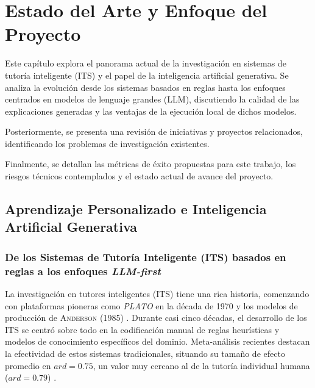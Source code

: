 \chapter{Estado del Arte y Enfoque del Proyecto}
\label{chap:estado_arte_enfoque}
\justifying

Este capítulo explora el panorama actual de la investigación en sistemas de tutoría inteligente (ITS) y el papel de la inteligencia artificial generativa. Se analiza la evolución desde los sistemas basados en reglas hasta los enfoques centrados en modelos de lenguaje grandes (LLM), discutiendo la calidad de las explicaciones generadas y las ventajas de la ejecución local de dichos modelos. 

Posteriormente, se presenta una revisión de iniciativas y proyectos relacionados, identificando los problemas de investigación existentes.

Finalmente, se detallan las métricas de éxito propuestas para este trabajo, los riesgos técnicos contemplados y el estado actual de avance del proyecto.

\section{Aprendizaje Personalizado e Inteligencia Artificial Generativa}
\label{sec:aprendizaje_personalizado_ia_generativa}

\subsection{De los Sistemas de Tutoría Inteligente (ITS) basados en reglas a los enfoques \textit{LLM-first}}
\label{ssec:its_a_llm_first}

La investigación en tutores inteligentes (ITS) tiene una rica historia, comenzando con plataformas pioneras como \emph{PLATO} en la década de 1970 y los modelos de producción de \textsc{Anderson} (1985) \cite{Anderson1985}. Durante casi cinco décadas, el desarrollo de los ITS se centró sobre todo en la codificación manual de reglas heurísticas y modelos de conocimiento específicos del dominio. Meta-análisis recientes destacan la efectividad de estos sistemas tradicionales, situando su tamaño de efecto promedio en \( ar d = 0.75\), un valor muy cercano al de la tutoría individual humana (\( ar d = 0.79\)) \cite{Kulik2016,Woolf2021}.

